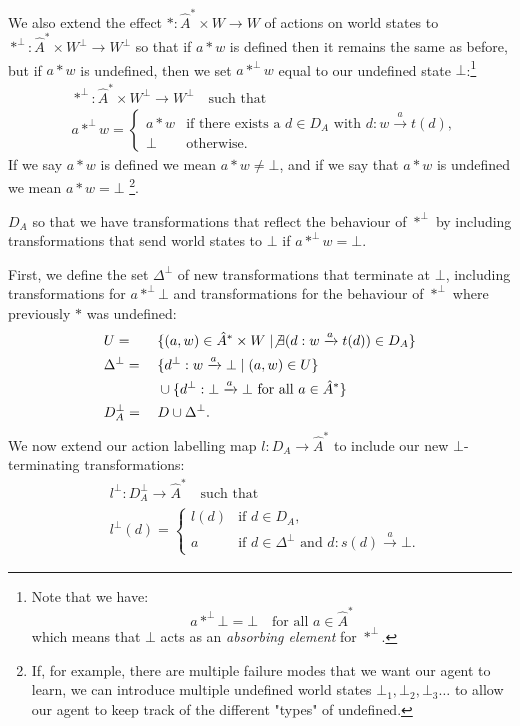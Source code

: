 We also extend the effect $\ast : \hat{A}^{*} \times W \to W$ of actions on world states to $\ast^{\bot} : \hat{A}^{*} \times W^{\bot} \to  W^{\bot}$ so that if $a \ast w$ is defined then it remains the same as before, but if $a \ast w$ is undefined, then we set $a \ast^{\bot} w$ equal to our undefined state $\bot$:\footnote{
    Note that we have:
    \begin{equation}
        a \ast^{\bot} \bot = \bot \quad \text{for all $a \in \hat{A}^{*}$}
    \end{equation}
    which means that $\bot$ acts as an \emph{absorbing element} for $\ast^{\bot}$.
}
\begin{align}
	 & \ast^{\bot} : \hat{A}^{*} \times W^{\bot} \to  W^{\bot} \quad\text{such that} \\
	 & a \ast^{\bot} w =
	\begin{cases}
		a \ast w & \text{if there exists a $d \in D_{A}$ with $d: w \xrightarrow{a} t(d)$}, \\
		\bot & \text{otherwise.}
	\end{cases}
\end{align}
If we say $a \ast w$ is defined we mean $a \ast w \neq \bot$, and if we say that $a \ast w$ is undefined we mean $a \ast w = \bot$ \footnote{
    If, for example, there are multiple failure modes that we want our agent to learn, we can introduce multiple undefined world states $\bot_{1}, \bot_{2}, \bot_{3} \dots$ to allow our agent to keep track of the different "types" of undefined.
}.

 $D_{A}$ so that we have transformations that reflect the behaviour of $\ast^{\bot}$ by including transformations that send world states to $\bot$ if $a \ast^{\bot} w = \bot$.

First, we define the set $\Delta^{\bot}$ of new transformations that terminate at $\bot$, including transformations for $a \ast^{\bot} \bot$ and transformations for the behaviour of $\ast^{\bot}$ where previously $\ast$ was undefined:
\begin{alignat}{2}
    & U {}={} && \{ (a,w) \in \hat{A}^{*} \times W \mid \not\exists (d: w \xrightarrow{a} t(d)) \in D_{A} \} \\
    & \Delta^{\bot} {}={} && \{ d^{\bot}: w \xrightarrow{a} \bot \mid (a, w) \in U \}                                       \\
                  &       && \cup \{ d^{\bot}: \bot \xrightarrow{a} \bot \text{ for all $a \in \hat{A}^{*}$} \} \\
    & D_{A}^{\bot} = && D \cup \Delta^{\bot}.
\end{alignat}
We now extend our action labelling map $l: D_{A} \to \hat{A}^{*}$ to include our new $\bot$-terminating transformations:
\begin{align}
	 & l^{\bot} : D_{A}^{\bot} \to \hat{A}^{*} \quad\text{such that} \\
	 & l^{\bot}(d) =
	\begin{cases}
		l(d) & \text{if $d \in D_{A}$}, \\
		a    & \text{if $d \in \Delta^{\bot}$ and $d: s(d) \xrightarrow{a} \bot$.}
	\end{cases}
\end{align}


